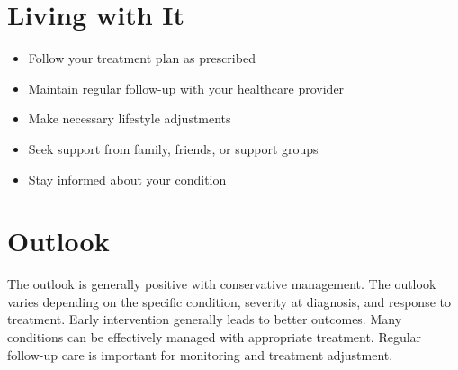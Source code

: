 \section{Living with It}
\begin{itemize}[noitemsep]
  \item Follow your treatment plan as prescribed
  \item Maintain regular follow-up with your healthcare provider
  \item Make necessary lifestyle adjustments
  \item Seek support from family, friends, or support groups
  \item Stay informed about your condition
\end{itemize}
\section{Outlook}
The outlook is generally positive with conservative management. The outlook varies depending on the specific condition, severity at diagnosis, and response to treatment. Early intervention generally leads to better outcomes. Many conditions can be effectively managed with appropriate treatment. Regular follow-up care is important for monitoring and treatment adjustment.
